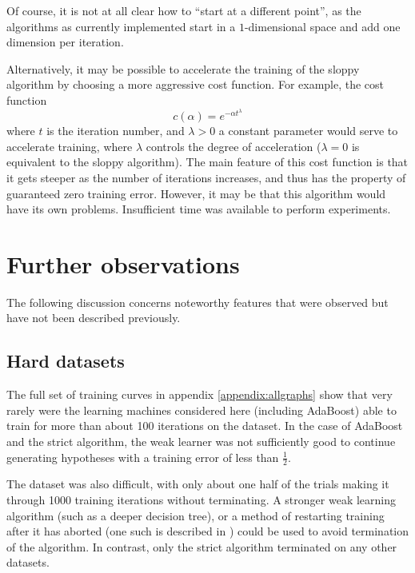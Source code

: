 Of course, it is not at all clear how to ``start at a different
point'', as the algorithms as currently implemented start in a
$1$-dimensional space and add one dimension per iteration.

Alternatively, it may be possible to accelerate the training of the
sloppy algorithm by choosing a more aggressive cost function.  For
example, the cost function
%
\begin{equation}
c(\alpha) = e^{-\alpha t^\lambda}
\end{equation}
%
where $t$ is the iteration number, and $\lambda>0$ a constant
parameter would serve to accelerate training, where $\lambda$ controls
the degree of acceleration ($\lambda=0$ is equivalent to the sloppy 
algorithm).  The main feature of this cost function is that it gets
steeper as the number of iterations increases, and thus has the
property of guaranteed zero training error.  However, it may be that
this algorithm would have its own problems.  Insufficient time was
available to perform experiments.

\section{Further observations}

The following discussion concerns noteworthy features that were
observed but have not been described previously.

\subsection{Hard datasets}

The full set of training curves in appendix \ref{appendix:allgraphs}
show that very rarely were the learning machines considered here
(including AdaBoost) able to train for more than about 100 iterations
on the  dataset.  In the case of AdaBoost and the strict
algorithm, the weak learner was not sufficiently good to continue
generating hypotheses with a training error of less than
$\frac{1}{2}$.

The  dataset was also difficult, with only about one half of
the trials making it through 1000 training iterations without
terminating.  A stronger weak learning algorithm (such as a deeper
decision tree), or a method of restarting training after it has
aborted (one such is described in \cite{Bauer99}) could be used to 
avoid termination of the algorithm.  In contrast, only the strict
algorithm terminated on any other datasets.

